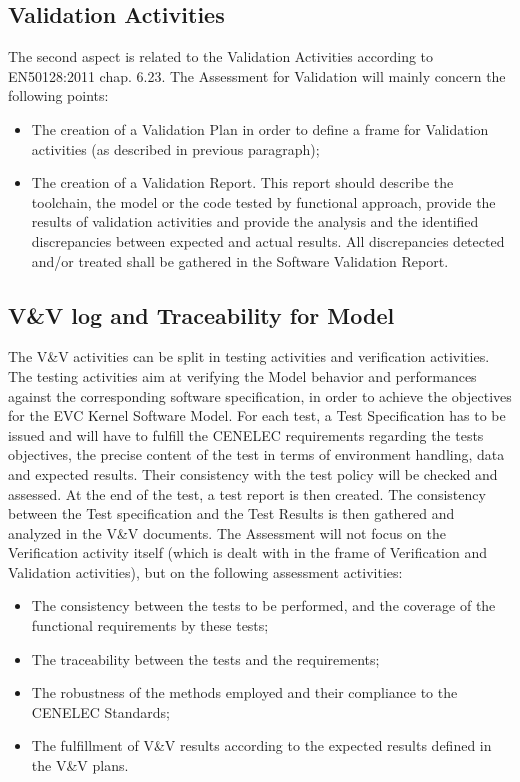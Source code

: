 \documentclass[openetcs]{template/openetcs_article}
\begin{document}
\subsection{Validation Activities}
The second aspect is related to the Validation Activities according to EN50128:2011 chap. 6.23. The Assessment for Validation will mainly concern the following points:
\begin{itemize}
\item The creation of a Validation Plan in order to define a frame for Validation activities (as described in previous paragraph);
\item The creation of a Validation Report. This report should describe the toolchain, the model or the code tested by functional approach, provide the results
of validation activities and provide the analysis and the identified discrepancies between expected and actual results. All discrepancies detected and/or
treated shall be gathered in the Software Validation Report.
\end{itemize}

\subsection{V\&V log and Traceability for Model}
The V\&V activities can be split in testing activities and verification activities. The testing activities aim at verifying the Model behavior and performances
against the corresponding software specification, in order to achieve the objectives for the EVC Kernel Software Model.
For each test, a Test Specification has to be issued and will have to fulfill the CENELEC requirements regarding the tests objectives, the precise content of
the test in terms of environment handling, data and expected results. Their consistency with the test policy will be checked and assessed. At the end of the
test, a test report is then created. The consistency between the Test specification and the Test Results is then gathered and analyzed in the V\&V documents.
The Assessment will not focus on the Verification activity itself (which is dealt with in the frame of Verification and Validation activities), but on
the following assessment activities:
\begin{itemize}
\item The consistency between the tests to be performed, and the coverage of the functional requirements by these tests;
\item The traceability between the tests and the requirements;
\item The robustness of the  methods employed and their compliance to the CENELEC Standards;
\item The fulfillment of V\&V results according to the expected results defined in the V\&V plans.
\end{itemize}
\end{document}
